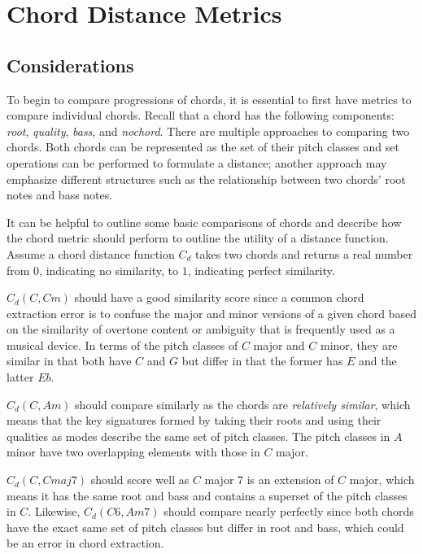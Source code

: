 \section{Chord Distance Metrics}

\subsection{Considerations}

To begin to compare progressions of chords, it is essential to first have metrics to compare individual chords. Recall that a chord has the following components: \textit{root}, \textit{quality}, \textit{bass}, and \textit{nochord}. There are multiple approaches to comparing two chords. Both chords can be represented as the set of their pitch classes and set operations can be performed to formulate a distance; another approach may emphasize different structures such as the relationship between two chords' root notes and bass notes.

It can be helpful to outline some basic comparisons of chords and describe how the chord metric should perform to outline the utility of a distance function. Assume a chord distance function $C_d$ takes two chords and returns a real number from $0$, indicating no similarity, to $1$, indicating perfect similarity.

$C_d(C,Cm)$ should have a good similarity score since a common chord extraction error is to confuse the major and minor versions of a given chord based on the similarity of overtone content or ambiguity that is frequently used as a musical device. In terms of the pitch classes of $C$ major and $C$ minor, they are similar in that both have $C$ and $G$ but differ in that the former has $E$ and the latter $Eb$.

$C_d(C,Am)$ should compare similarly as the chords are \textit{relatively similar}, which means that the key signatures formed by taking their roots and using their qualities as modes describe the same set of pitch classes. The pitch classes in $A$ minor have two overlapping elements with those in $C$ major.

$C_d(C,Cmaj7)$ should score well as $C$ major 7 is an extension of $C$ major, which means it has the same root and bass and contains a superset of the pitch classes in $C$. Likewise, $C_d(C6, Am7)$ should compare nearly perfectly since both chords have the exact same set of pitch classes but differ in root and bass, which could be an error in chord extraction.

